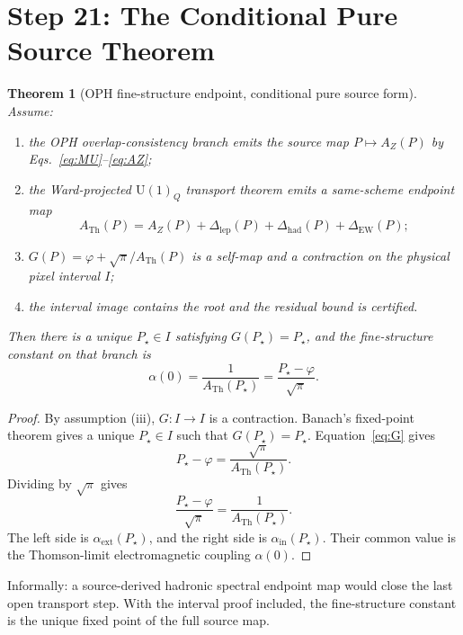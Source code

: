 \documentclass[11pt]{article}
\newtheorem{theorem}{Theorem}
\theoremstyle{remark}
\newcommand{\U}{\mathrm{U}}
\newcommand{\ATh}{A_{\mathrm{Th}}}
\newcommand{\AZ}{A_Z}
\newcommand{\Dlep}{\Delta_{\mathrm{lep}}}
\newcommand{\Dhad}{\Delta_{\mathrm{had}}}
\newcommand{\DEW}{\Delta_{\mathrm{EW}}}
\begin{document}
\section{Step 21: The Conditional Pure Source Theorem}

\begin{theorem}[OPH fine-structure endpoint, conditional pure source form]
Assume:
\begin{enumerate}[label=(\roman*)]
\item the OPH overlap-consistency branch emits the source map \(P\mapsto \AZ(P)\) by Eqs.~\eqref{eq:MU}--\eqref{eq:AZ};
\item the Ward-projected \(\U(1)_Q\) transport theorem emits a same-scheme endpoint map
\[
\ATh(P)=\AZ(P)+\Dlep(P)+\Dhad(P)+\DEW(P);
\]
\item \(G(P)=\varphi+\sqrt\pi/\ATh(P)\) is a self-map and a contraction on the physical pixel interval \(I\);
\item the interval image contains the root and the residual bound is certified.
\end{enumerate}
Then there is a unique \(P_\star\in I\) satisfying \(G(P_\star)=P_\star\), and the fine-structure constant on that branch is
\[
\alpha(0)=\frac{1}{\ATh(P_\star)}=\frac{P_\star-\varphi}{\sqrt\pi}.
\]
\end{theorem}

\begin{proof}
By assumption (iii), \(G:I\to I\) is a contraction. Banach's fixed-point theorem gives a unique \(P_\star\in I\) such that \(G(P_\star)=P_\star\). Equation~\eqref{eq:G} gives
\[
P_\star-\varphi=\frac{\sqrt\pi}{\ATh(P_\star)}.
\]
Dividing by \(\sqrt\pi\) gives
\[
\frac{P_\star-\varphi}{\sqrt\pi}=\frac{1}{\ATh(P_\star)}.
\]
The left side is \(\alpha_{\mathrm{ext}}(P_\star)\), and the right side is \(\alpha_{\mathrm{in}}(P_\star)\). Their common value is the Thomson-limit electromagnetic coupling \(\alpha(0)\).
\end{proof}

Informally: a source-derived hadronic spectral endpoint map would close the last open transport step. With the interval proof included, the fine-structure constant is the unique fixed point of the full source map.
\end{document}
